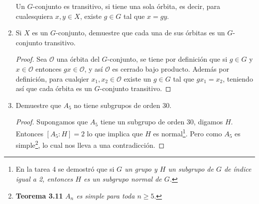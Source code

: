 \documentclass[letterpaper]{article}
\begin{document}
\begin{enumerate}
\begin{definition}
    Un $G$-conjunto es transitivo, si tiene una sola órbita, es decir, para cualesquiera $x, y \in X$, existe
    $g \in G$ tal que $x = gy$.
\end{definition}

\item Si $X$ es un $G$-conjunto, demuestre que cada una de sus órbitas es un $G$-conjunto transitivo.
\begin{proof}
Sea $\mathcal{O}$ una órbita del $G$-conjunto, se tiene por definición que si $g \in G$ y $x \in \mathcal{O}$
entonces $gx \in \mathcal{O}$, y así $\mathcal{O}$ es cerrado bajo producto. Además por definición, para
cualqier $x_1, x_2 \in \mathcal{O}$ existe un $g \in G$ tal que $g x_1 = x_2$, teniendo así que cada órbita
es un $G$-conjunto transitivo.
\end{proof}

\item Demuestre que $A_5$ no tiene subgrupos de orden 30.
\begin{proof}
Supongamos que $A_5$ tiene un subgrupo de orden 30, digamos $H$. Entonces $[A_5 : H] = 2$ lo que implica que
$H$ es normal\footnote{En la tarea 4 se demostró que si \emph{$G$ un grupo y $H$ un subgrupo de $G$ de índice
igual a 2, entonces $H$ es un subgrupo normal de $G$.}}.
Pero como $A_5$ es simple\footnote{\textbf{Teorema 3.11} \emph{$A_n$ es simple para toda $n \geq 5$}.}, lo
cual nos lleva a una contradicción.
\end{proof}
\end{enumerate} 



\end{document}
